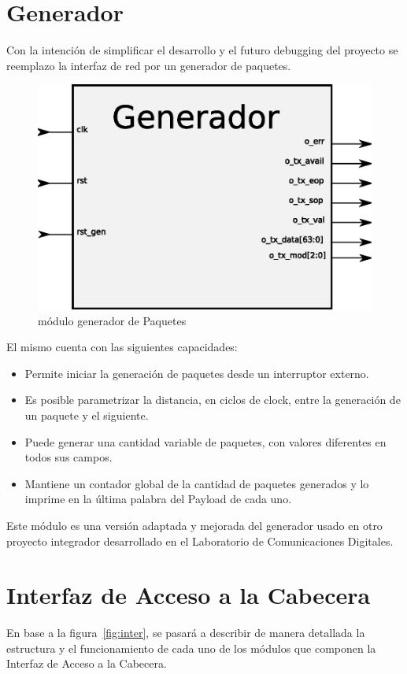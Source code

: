 \section{Generador}

Con la intención de simplificar el desarrollo y el futuro debugging del proyecto se reemplazo la interfaz de red por un generador de paquetes.

\begin{figure}[H]
  \centering
	\includegraphics[scale=0.50]{3-arquitectura/graf/bloqgenerador.eps}
  \caption{módulo generador de Paquetes}
  \label{fig:gen}
\end{figure}


El mismo cuenta con las siguientes capacidades:

\begin{itemize}
	\item Permite iniciar la generación de paquetes desde un interruptor externo.
	\item Es posible parametrizar la distancia, en ciclos de clock, entre la generación de un paquete y el siguiente.
	\item Puede generar una cantidad variable de paquetes, con valores diferentes en todos sus campos.
	\item Mantiene un contador global de la cantidad de paquetes generados y lo imprime en la última palabra del Payload de cada uno.
\end{itemize}

Este módulo es una versión adaptada y mejorada del generador usado en otro proyecto integrador\cite{spaz} desarrollado en el Laboratorio de Comunicaciones Digitales.

\section{Interfaz de Acceso a la Cabecera}
En base a la figura~\ref{fig:inter}, se pasará a describir de manera detallada la estructura y el funcionamiento de cada uno de los módulos que componen la Interfaz de Acceso a la Cabecera. 

